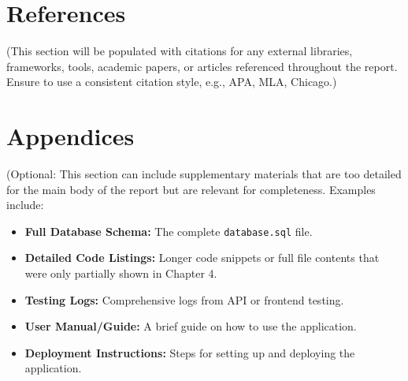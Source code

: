 \documentclass{report}
\begin{document}
\chapter*{References} %
(This section will be populated with citations for any external libraries, frameworks, tools, academic papers, or articles referenced throughout the report. Ensure to use a consistent citation style, e.g., APA, MLA, Chicago.)

\chapter*{Appendices} %
(Optional: This section can include supplementary materials that are too detailed for the main body of the report but are relevant for completeness. Examples include:
\begin{itemize}
    \item \textbf{Full Database Schema:} The complete \texttt{database.sql} file.
    \item \textbf{Detailed Code Listings:} Longer code snippets or full file contents that were only partially shown in Chapter 4.
    \item \textbf{Testing Logs:} Comprehensive logs from API or frontend testing.
    \item \textbf{User Manual/Guide:} A brief guide on how to use the application.
    \item \textbf{Deployment Instructions:} Steps for setting up and deploying the application.
\end{itemize}
\end{document}
